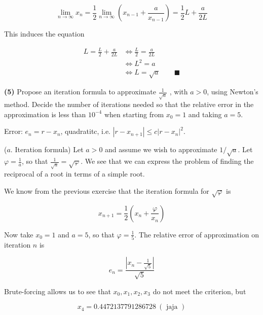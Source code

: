 \documentclass[12pt]{article}
\theoremstyle{definition}
\begin{document}
\begin{equation*}
    \lim_{n \to \infty} x_{n} = \frac{1}{2}\lim_{n \to \infty} \left( x_{n-1} +
    \frac{a}{x_{n-1}}\right) = \frac{1}{2}L + \frac{a}{2L}
\end{equation*}

This induces the equation 

\begin{align*}
    L = \frac{L}{2} + \frac{a}{2L} 
    &\iff \frac{L}{2} = \frac{a}{2L} \\ 
    &\iff L^2 = a\\
    &\iff L = \sqrt{a}  \qquad \blacksquare
\end{align*}

\pagebreak 

\begin{shaded}
    \textbf{(5)} Propose an iteration formula to approximate $\frac{1}{\sqrt{a}
    }$ , with $a > 0$, using Newton's method. Decide the number of iterations
    needed so that the relative error in the approximation is less than
    $10^{-4}$ when starting from $x_0 = 1$ and taking $a = 5$.
\end{shaded}

Error: $e_n = r - x_n$, quadratitc, i.e. $| r - x_{n+1}| \leq c |r - x_n|^2$.

($a$. Iteration formula) Let $a > 0$ and assume we wish to approximate $1 /
\sqrt{a} $. Let $\varphi = \frac{1}{a}$, so that $\frac{1}{\sqrt{a} } =
\sqrt{\varphi} $. We see that we can express the problem of finding the
reciprocal of a root in terms of a simple root.

We know from the previous exercise that the iteration formula for
$\sqrt{\varphi} $ is 

\begin{equation*}
    x_{n+1}=\frac{1}{2}\left( x_n + \frac{\varphi}{x_n} \right)  
\end{equation*}

Now take $x_{0} = 1$ and $a = 5$, so that
$\varphi = \frac{1}{5}$. The relative error of approximation on iteration $n$ is 

\begin{equation*}
    e_n = \frac{ \left| x_n - \frac{1}{\sqrt{5} } \right|  }{\sqrt{5} }
\end{equation*}

Brute-forcing allows us  to see that $x_0, x_1, x_2, x_3$ do not meet the criterion,
but 

\begin{equation*}
    x_4 = 0.4472137791286728 ~ (\text{ jaja } )
\end{equation*}
\end{document}
